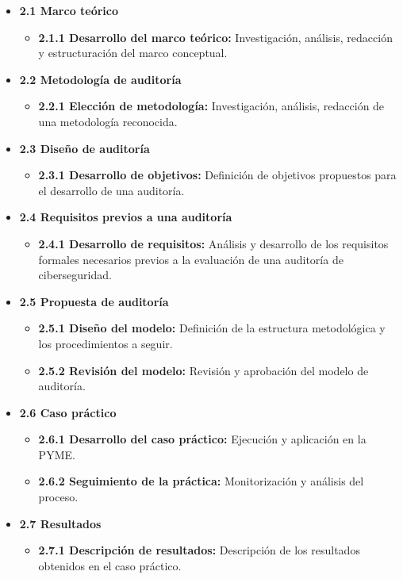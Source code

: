 \documentclass[a4paper, 11pt]{article}
\begin{document}
\begin{itemize}
    \item \textbf{2.1 Marco teórico}
    \begin{itemize}
        \item \textbf{2.1.1 Desarrollo del marco teórico:} Investigación, análisis, redacción y estructuración del marco conceptual.
    \end{itemize}

    \item \textbf{2.2 Metodología de auditoría}
    \begin{itemize}
        \item \textbf{2.2.1 Elección de metodología:} Investigación, análisis, redacción de una metodología reconocida.
    \end{itemize}


    \item \textbf{2.3 Diseño de auditoría}
    \begin{itemize}
        \item \textbf{2.3.1 Desarrollo de objetivos:} Definición de objetivos propuestos para el desarrollo de una auditoría.
    \end{itemize}

      \item \textbf{2.4 Requisitos previos a una auditoría}
    \begin{itemize}
        \item \textbf{2.4.1 Desarrollo de requisitos:} Análisis y desarrollo de los requisitos formales necesarios previos a la evaluación de una auditoría de ciberseguridad.
    \end{itemize}

    \item \textbf{2.5 Propuesta de auditoría}
    \begin{itemize}
        \item \textbf{2.5.1 Diseño del modelo:} Definición de la estructura metodológica y los procedimientos a seguir.
        \item \textbf{2.5.2 Revisión del modelo:} Revisión y aprobación del modelo de auditoría.
    \end{itemize}

    \item \textbf{2.6 Caso práctico}
    \begin{itemize}
        \item \textbf{2.6.1 Desarrollo del caso práctico:} Ejecución y aplicación en la PYME.
        \item \textbf{2.6.2 Seguimiento de la práctica:} Monitorización y análisis del proceso.
    \end{itemize}


   \item \textbf{2.7 Resultados}
    \begin{itemize}
        \item \textbf{2.7.1 Descripción de resultados:} Descripción de los resultados obtenidos en el caso práctico.
    \end{itemize}
\end{itemize}
\end{document}
